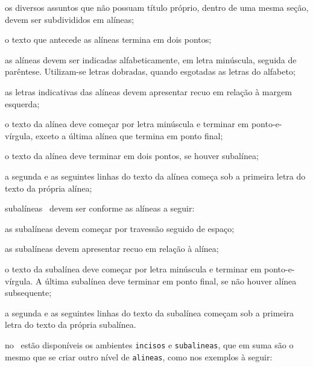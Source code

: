 \begin{alineas}

  \item os diversos assuntos que não possuam título próprio, dentro de uma mesma
  seção, devem ser subdivididos em alíneas;

  \item o texto que antecede as alíneas termina em dois pontos;
  \item as alíneas devem ser indicadas alfabeticamente, em letra minúscula,
  seguida de parêntese. Utilizam-se letras dobradas, quando esgotadas as
  letras do alfabeto;

  \item as letras indicativas das alíneas devem apresentar recuo em relação à
  margem esquerda;

  \item o texto da alínea deve começar por letra minúscula e terminar em
  ponto-e-vírgula, exceto a última alínea que termina em ponto final;

  \item o texto da alínea deve terminar em dois pontos, se houver subalínea;

  \item a segunda e as seguintes linhas do texto da alínea começa sob a
  primeira letra do texto da própria alínea;

\item subalíneas~\cite[4.3]{NBR6024:2012} devem ser conforme as alíneas a
  seguir:

  \begin{alineas}
\item as subalíneas devem começar por travessão seguido de espaço;

\item as subalíneas devem apresentar recuo em relação à alínea;

\item o texto da subalínea deve começar por letra minúscula e terminar em
ponto-e-vírgula. A última subalínea deve terminar em ponto final, se não
houver alínea subsequente;

\item a segunda e as seguintes linhas do texto da subalínea começam sob a
primeira letra do texto da própria subalínea.
  \end{alineas}

  \item no \abnTeX\ estão disponíveis os ambientes \texttt{incisos} e
  \texttt{subalineas}, que em suma são o mesmo que se criar outro nível de
  \texttt{alineas}, como nos exemplos à seguir:


\end{alineas}
